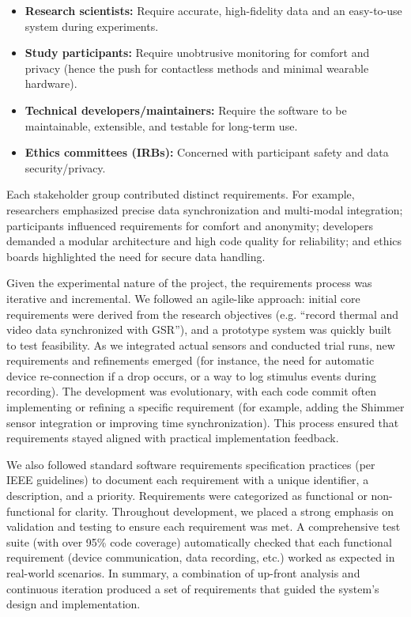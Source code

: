 \begin{itemize}
\item \textbf{Research scientists:} Require accurate, high-fidelity data and an easy-to-use system during experiments.
\item \textbf{Study participants:} Require unobtrusive monitoring for comfort and privacy (hence the push for contactless methods and minimal wearable hardware).
\item \textbf{Technical developers/maintainers:} Require the software to be maintainable, extensible, and testable for long-term use.
\item \textbf{Ethics committees (IRBs):} Concerned with participant safety and data security/privacy.
\end{itemize}

Each stakeholder group contributed distinct requirements. For example, researchers emphasized precise data synchronization and multi-modal integration; participants influenced requirements for comfort and anonymity; developers demanded a modular architecture and high code quality for reliability; and ethics boards highlighted the need for secure data handling.

Given the experimental nature of the project, the requirements process was iterative and incremental. We followed an agile-like approach: initial core requirements were derived from the research objectives (e.g. ``record thermal and video data synchronized with GSR''), and a prototype system was quickly built to test feasibility. As we integrated actual sensors and conducted trial runs, new requirements and refinements emerged (for instance, the need for automatic device re-connection if a drop occurs, or a way to log stimulus events during recording). The development was evolutionary, with each code commit often implementing or refining a specific requirement (for example, adding the Shimmer sensor integration or improving time synchronization). This process ensured that requirements stayed aligned with practical implementation feedback.

We also followed standard software requirements specification practices (per IEEE guidelines) to document each requirement with a unique identifier, a description, and a priority. Requirements were categorized as functional or non-functional for clarity. Throughout development, we placed a strong emphasis on validation and testing to ensure each requirement was met. A comprehensive test suite (with over 95\% code coverage) automatically checked that each functional requirement (device communication, data recording, etc.) worked as expected in real-world scenarios. In summary, a combination of up-front analysis and continuous iteration produced a set of requirements that guided the system's design and implementation.

